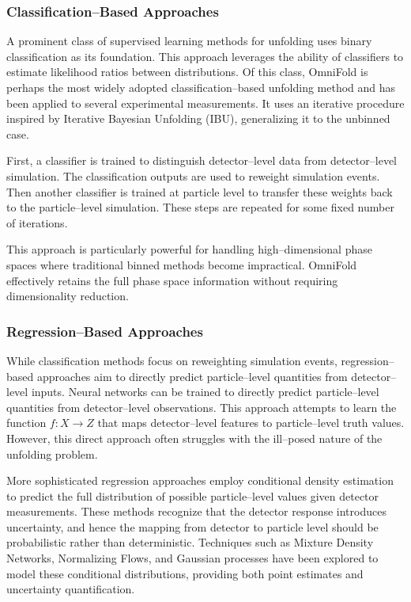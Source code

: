         \subsubsection{Classification--Based Approaches}
            A prominent class of supervised learning methods for unfolding uses binary classification as its foundation.
            This approach leverages the ability of classifiers to estimate likelihood ratios between distributions.
            Of this class, OmniFold is perhaps the most widely adopted classification--based unfolding method and has been applied to several experimental measurements.
            It uses an iterative procedure inspired by Iterative Bayesian Unfolding (IBU), generalizing it to the unbinned case.

            First, a classifier is trained to distinguish detector--level data from detector--level simulation.
            The classification outputs are used to reweight simulation events.
            Then another classifier is trained at particle level to transfer these weights back to the particle--level simulation.
            These steps are repeated for some fixed number of iterations.

            This approach is particularly powerful for handling high--dimensional phase spaces where traditional binned methods become impractical.
            OmniFold effectively retains the full phase space information without requiring dimensionality reduction.
        \subsubsection{Regression--Based Approaches}
            While classification methods focus on reweighting simulation events, regression--based approaches aim to directly predict particle--level quantities from detector--level inputs.
            Neural networks can be trained to directly predict particle--level quantities from detector--level observations.
            This approach attempts to learn the function \(f: X \rightarrow Z\) that maps detector--level features to particle--level truth values.
            However, this direct approach often struggles with the ill--posed nature of the unfolding problem.

            More sophisticated regression approaches employ conditional density estimation to predict the full distribution of possible particle--level values given detector measurements.
            These methods recognize that the detector response introduces uncertainty, and hence the mapping from detector to particle level should be probabilistic rather than deterministic.
            Techniques such as Mixture Density Networks,  Normalizing Flows,\kd{} and Gaussian processes\kd{} have been explored to model these conditional distributions, providing both point estimates and uncertainty quantification.
